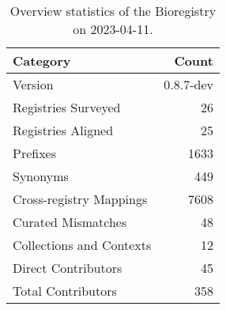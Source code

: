 \begin{table}
\caption{Overview statistics of the Bioregistry on 2023-04-11.}
\label{tab:bioregistry-summary}
\begin{tabular}{lr}
\toprule
Category & Count \\
\midrule
Version & 0.8.7-dev \\
Registries Surveyed & 26 \\
Registries Aligned & 25 \\
Prefixes & 1633 \\
Synonyms & 449 \\
Cross-registry Mappings & 7608 \\
Curated Mismatches & 48 \\
Collections and Contexts & 12 \\
Direct Contributors & 45 \\
Total Contributors & 358 \\
\bottomrule
\end{tabular}
\end{table}
